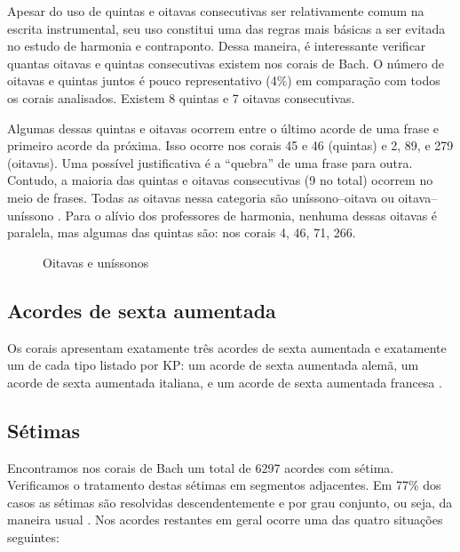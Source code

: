 Apesar do uso de quintas e oitavas consecutivas ser relativamente
comum na escrita instrumental, seu uso constitui uma das regras mais
básicas a ser evitada no estudo de harmonia e contraponto. Dessa
maneira, é interessante verificar quantas oitavas e quintas
consecutivas existem nos corais de Bach. O número de oitavas e quintas
juntos é pouco representativo (4\%) em comparação com todos os corais
analisados. Existem 8 quintas e 7 oitavas consecutivas.

Algumas dessas quintas e oitavas ocorrem entre o último acorde de uma
frase e primeiro acorde da próxima. Isso ocorre nos corais 45 e 46
(quintas) e 2, 89, e 279 (oitavas).  Uma possível
justificativa é a ``quebra'' de uma frase para outra. Contudo, a
maioria das quintas e oitavas consecutivas (9 no total) ocorrem no
meio de frases. Todas as oitavas nessa categoria são uníssono--oitava
ou oitava--uníssono . Para o alívio dos professores de
harmonia, nenhuma dessas oitavas é paralela, mas algumas das quintas
são: nos corais 4, 46, 71, 266.

\begin{figure}
  \centering
  \qquad
  \qquad
  \caption{Oitavas e uníssonos}
  \label{fig:oitavas-e-unissonos}
\end{figure}

\subsection{Acordes de sexta aumentada}
\label{sec:acordes-de-sexta}

Os corais apresentam exatamente três acordes de sexta aumentada e
exatamente um de cada tipo listado por KP: um acorde de sexta
aumentada alemã, um acorde de sexta aumentada italiana, e um acorde de
sexta aumentada francesa .

\subsection{Sétimas}
\label{sec:setimas}

Encontramos nos corais de Bach um total de 6297 acordes com sétima.
Verificamos o tratamento destas sétimas em segmentos adjacentes. Em
77\% dos casos as sétimas são resolvidas descendentemente e por grau
conjunto, ou seja, da maneira usual \cite[p. 207]{kostka.ea00:tonal}.
Nos acordes restantes em geral ocorre uma das quatro situações
seguintes:

